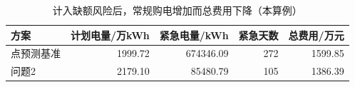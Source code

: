 \begin{table}[H]
\centering\small
\caption{计入缺额风险后，常规购电增加而总费用下降（本算例）}
\label{tab:risk}
\begin{tabular}{lrrrr}\toprule
方案 & 计划电量/万kWh & 紧急电量/kWh & 紧急天数 & 总费用/万元 \\\midrule
点预测基准 & 1999.72 & 674346.09 & 272 & 1599.85 \\
问题2 & 2179.10 & 85480.79 & 105 & 1386.39 \\
\bottomrule\end{tabular}
\end{table}
